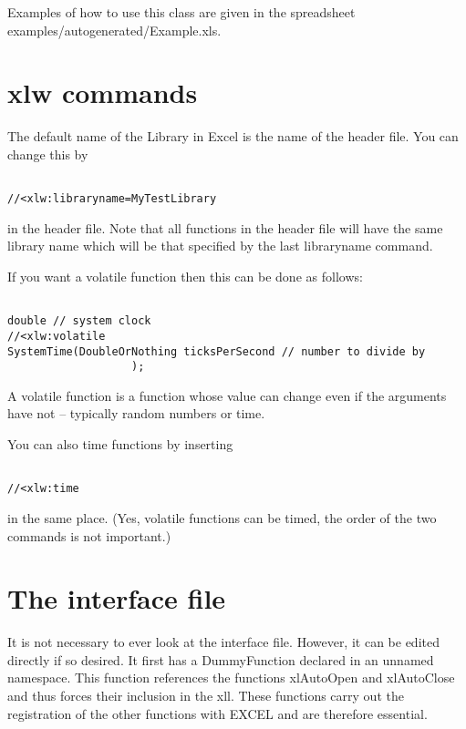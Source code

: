 \documentclass[12pt,reqno]{amsart}
\numberwithin{equation}{section}
\numberwithin{figure}{section}
\begin{document}
Examples of how to use this class are given in the spreadsheet
examples/autogenerated/Example.xls.

\section{xlw commands}

The default name of the Library in Excel is the name of the header
file. You can change this by

\begin{verbatim}

//<xlw:libraryname=MyTestLibrary

\end{verbatim}

in the header file. Note that all functions in the header file will have
the same library name which will be that specified by the last
libraryname command. 

If you want a volatile function then this can be done as follows:

\begin{verbatim}

double // system clock
//<xlw:volatile    
SystemTime(DoubleOrNothing ticksPerSecond // number to divide by
                   );

\end{verbatim}

A volatile function is a function whose value can change even if the
arguments have not -- typically random numbers or time. 

You can also time functions by inserting 
\begin{verbatim}

//<xlw:time

\end{verbatim}
in the same place. (Yes, volatile functions can be timed, the order of
the two commands is not important.)


\section{The interface file}

It is not necessary to ever look at the interface file. However, it
can be edited directly if so desired. It first has a DummyFunction
declared in an unnamed namespace. This function references the
functions xlAutoOpen and xlAutoClose and thus forces their inclusion
in the xll. These functions carry out the registration of the other
functions with EXCEL and are therefore essential. 
\end{document}
